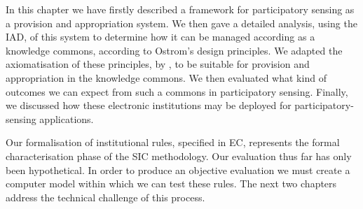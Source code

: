 In this chapter we have firstly described a framework for participatory sensing as a provision and appropriation system. We then gave a detailed analysis, using the \ac{IAD}, of this system to determine how it can be managed according as a knowledge commons, according to Ostrom's design principles. We adapted the axiomatisation of these principles, by \citet{Pitt2012b}, to be suitable for provision and appropriation in the knowledge commons. We then evaluated what kind of outcomes we can expect from such a commons in participatory sensing. Finally, we discussed how these electronic institutions may be deployed for participatory-sensing applications.

Our formalisation of institutional rules, specified in \ac{EC}, represents the formal characterisation phase of the \ac{SIC} methodology. Our evaluation thus far has only been hypothetical. In order to produce an objective evaluation we must create a computer model within which we can test these rules. The next two chapters address the technical challenge of this process.



